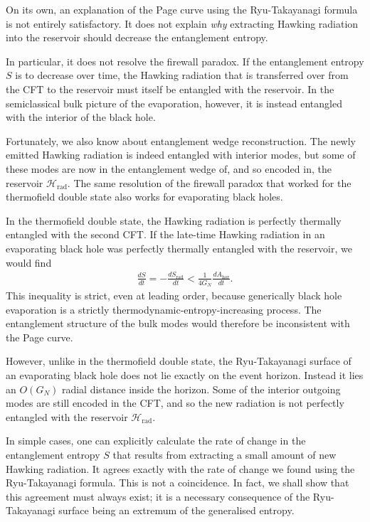 \documentclass[12pt]{article}
\newcommand{\Srad}{S_\text{rad} }
\begin{document}
On its own, an explanation of the Page curve using the Ryu-Takayanagi formula is not entirely satisfactory. It does not explain \emph{why} extracting Hawking radiation into the reservoir should decrease the entanglement entropy. 

In particular, it does not resolve the firewall paradox. If the entanglement entropy $S$ is to decrease over time, the Hawking radiation that is transferred over from the CFT to the reservoir must itself be entangled with the reservoir. In the semiclassical bulk picture of the evaporation, however, it is instead entangled with the interior of the black hole.

Fortunately, we also know about entanglement wedge reconstruction. The newly emitted Hawking radiation is indeed entangled with interior modes, but some of these modes are now in the entanglement wedge of, and so encoded in, the reservoir $\mathcal{H}_\text{rad}$. The same resolution of the firewall paradox that worked for the thermofield double state also works for evaporating black holes. 

In the thermofield double state, the Hawking radiation is perfectly thermally entangled with the second CFT. If the late-time Hawking radiation in an evaporating black hole was perfectly thermally entangled with the reservoir, we would find
\begin{align}
\frac{dS}{dt} = -\frac{d\Srad}{dt} < \frac{1}{4 G_N}\frac{d A_\text{hor}}{dt}.
\end{align}
This inequality is strict, even at leading order, because generically black hole evaporation is a strictly thermodynamic-entropy-increasing process. The entanglement structure of the bulk modes would therefore be inconsistent with the Page curve.

However, unlike in the thermofield double state, the Ryu-Takayanagi surface of an evaporating black hole does not lie exactly on the event horizon. Instead it lies an $O(G_N)$ radial distance inside the horizon. Some of the interior outgoing modes are still encoded in the CFT, and so the new radiation is not perfectly entangled with the reservoir $\mathcal{H}_\text{rad}$.

In simple cases, one can explicitly calculate the rate of change in the entanglement entropy $S$ that results from extracting a small amount of new Hawking radiation. It agrees exactly with the rate of change we found using the Ryu-Takayanagi formula. This is not a coincidence. In fact, we shall show that this agreement must always exist; it is a necessary consequence of the Ryu-Takayanagi surface being an extremum of the generalised entropy.
\end{document}
